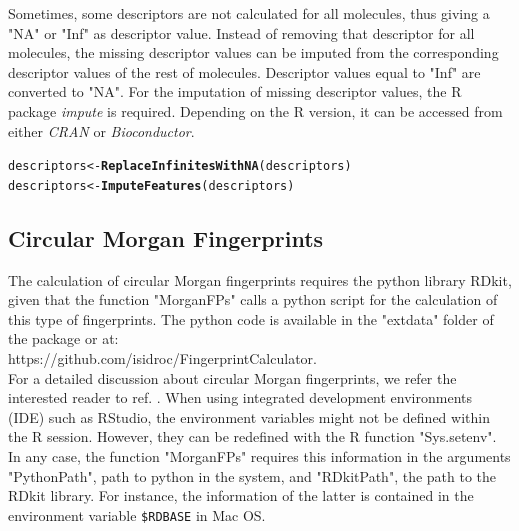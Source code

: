 \documentclass[twoside,a4wide,12pt]{article}\usepackage[]{graphicx}\usepackage[]{color}
\makeatletter
\newcommand{\hlstd}[1]{\textcolor[rgb]{0.345,0.345,0.345}{#1}}%
\newcommand{\hlkwb}[1]{\textcolor[rgb]{0.69,0.353,0.396}{#1}}%
\newcommand{\hlkwd}[1]{\textcolor[rgb]{0.737,0.353,0.396}{\textbf{#1}}}%
\newenvironment{kframe}{%
 \def\at@end@of@kframe{}%
 \ifinner\ifhmode%
  \def\at@end@of@kframe{\end{minipage}}%
  \begin{minipage}{\columnwidth}%
 \fi\fi%
 \def\FrameCommand##1{\hskip\@totalleftmargin \hskip-\fboxsep
 \colorbox{shadecolor}{##1}\hskip-\fboxsep
     \hskip-\linewidth \hskip-\@totalleftmargin \hskip\columnwidth}%
 \MakeFramed {\advance\hsize-\width
   \@totalleftmargin\z@ \linewidth\hsize
   \@setminipage}}%
 {\par\unskip\endMakeFramed%
 \at@end@of@kframe}
\newenvironment{knitrout}{}{} %
\makeatother
\begin{document}
Sometimes, some descriptors are not calculated for all molecules, thus giving a "NA" or "Inf" as descriptor value.
Instead of removing that descriptor for all molecules, the missing descriptor values can be imputed from the corresponding descriptor values of the rest of molecules.
Descriptor values equal to "Inf" are converted to "NA".
For the imputation of missing descriptor values, the R package {\it impute} is required.
Depending on the R version, it can be accessed from either {\it CRAN} or {\it Bioconductor}.

\begin{knitrout}
\color{fgcolor}\begin{kframe}
\begin{alltt}
\hlstd{descriptors} \hlkwb{<-} \hlkwd{ReplaceInfinitesWithNA}\hlstd{(descriptors)}
\hlstd{descriptors} \hlkwb{<-} \hlkwd{ImputeFeatures}\hlstd{(descriptors)}
\end{alltt}
\end{kframe}
\end{knitrout}

\subsection{Circular Morgan Fingerprints}
The calculation of circular Morgan fingerprints requires the python library RDkit,
given that the function "MorganFPs" calls a python script for the calculation of this type of fingerprints.
The python code is available in the "extdata" folder of the package or at:\\
https://github.com/isidroc/FingerprintCalculator.\\
For a detailed discussion about circular Morgan fingerprints, we refer
the interested reader to ref. \cite{morgan}.
When using integrated development environments (IDE) such as RStudio,
the environment variables might not be defined within the R session.
However, they can be redefined with the R function "Sys.setenv".
In any case, the function "MorganFPs" requires this information in the arguments "PythonPath", path to python in the system, and "RDkitPath", the path to the RDkit library. 
For instance, the information of the latter is contained in the environment variable \verb|$RDBASE| in Mac OS.
\end{document}
